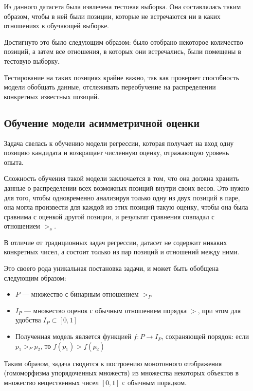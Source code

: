 \documentclass[14pt]{mmcs_article}
\begin{document}
Из данного датасета была извлечена тестовая выборка. Она составлялась таким образом, чтобы в ней были позиции, которые не встречаются ни в каких отношениях в обучающей выборке.

Достигнуто это было следующим образом: было отобрано некоторое количество позиций, а затем все отношения, в которых они встречались, были помещены в тестовую выборку.

Тестирование на таких позициях крайне важно, так как проверяет способность модели обобщать данные, отслеживать переобучение на распределении конкретных известных позиций.

\subsection{Обучение модели асимметричной оценки}

Задача свелась к обучению модели регрессии, которая получает на вход одну позицию кандидата и возвращает численную оценку, отражающую уровень опыта.

Сложность обучения такой модели заключается в том, что она должна хранить данные о распределении всех возможных позиций внутри своих весов. Это нужно для того, чтобы одновременно анализируя только одну из двух позиций в паре, она могла произвести для каждой из этих позиций такую оценку, чтобы она была сравнима с оценкой другой позиции, и результат сравнения совпадал с отношением $>_{s}$.

В отличие от традиционных задач регрессии, датасет не содержит никаких конкретных чисел, а состоит только из пар позиций и отношений между ними.

Это своего рода уникальная постановка задачи, и может быть обобщена следующим образом:

\begin{itemize}
  \item $P$ --- множество с бинарным отношением $>_{P}$
  \item $I_{P}$ --- множество оценок с обычным отношением порядка $>$, при этом для удобства $I_{P} \subset [0, 1]$
  \item Полученная модель является функцией $f: P \rightarrow I_{P}$, сохраняющей порядок: если $p_{1} >_{P} p_{2}$, то $f(p_{1}) > f(p_{2})$
\end{itemize}

Таким образом, задача сводится к построению монотонного отображения (гомоморфизма упорядоченных множеств) из множества некоторых объектов в множество вещественных чисел $[0, 1]$ с обычным порядком.
\end{document}
